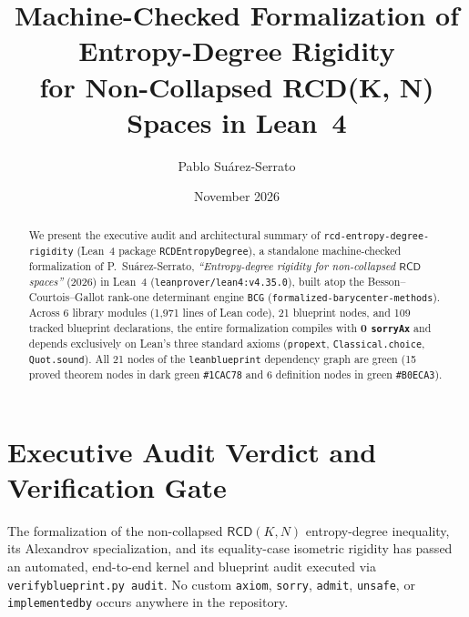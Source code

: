 \documentclass[10pt]{article}
\title{\vspace{-1.8em}\textbf{Machine-Checked Formalization of Entropy-Degree Rigidity\\for Non-Collapsed RCD(K, N) Spaces in Lean~4}}
\author{Pablo Su\'arez-Serrato}
\date{November 2026\vspace{-1.0em}}
\renewcommand{\_}{\origus\allowbreak}
\newcommand{\code}[1]{\texttt{#1}}
\newcommand{\LeanToolchain}{leanprover/lean4:v4.35.0}
\newcommand{\NModules}{6}
\newcommand{\NLines}{1{,}971}
\newcommand{\NTotalNodes}{21}
\newcommand{\NProvedNodes}{15}
\newcommand{\NDefNodes}{6}
\newcommand{\NLeanDecls}{109}
\newcommand{\NSorryAx}{0}
\begin{document}
\maketitle

\begin{abstract}
\noindent
We present the executive audit and architectural summary of \code{rcd-entropy-degree-rigidity} (Lean~4
package \code{RCDEntropyDegree}), a standalone machine-checked formalization of P.~Su\'arez-Serrato,
\emph{``Entropy-degree rigidity for non-collapsed $\mathsf{RCD}$ spaces''} (2026) in Lean~4
(\code{\LeanToolchain}), built atop the Besson--Courtois--Gallot rank-one determinant engine
\code{BCG} (\code{formalized-barycenter-methods}). Across \NModules{} library modules
(\NLines{} lines of Lean code), \NTotalNodes{} blueprint nodes, and \NLeanDecls{} tracked blueprint
declarations, the entire formalization compiles with \textbf{\NSorryAx{} \code{sorryAx}} and depends
exclusively on Lean's three standard axioms (\code{propext}, \code{Classical.choice}, \code{Quot.sound}).
All \NTotalNodes{} nodes of the \code{leanblueprint} dependency graph are green (\NProvedNodes{} proved
theorem nodes in dark green \code{\#1CAC78} and \NDefNodes{} definition nodes in green \code{\#B0ECA3}).
\end{abstract}

\section{Executive Audit Verdict and Verification Gate}

The formalization of the non-collapsed $\mathsf{RCD}(K, N)$ entropy-degree inequality, its Alexandrov
specialization, and its equality-case isometric rigidity has passed an automated, end-to-end kernel and
blueprint audit executed via \code{verify\_blueprint.py audit}. No custom \code{axiom}, \code{sorry},
\code{admit}, \code{unsafe}, or \code{implemented\_by} occurs anywhere in the repository.
\end{document}
